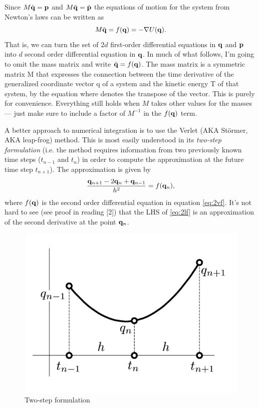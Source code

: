 Since $M\dot{\bf q} = {\bf p}$ and $M\ddot{\bf q} = \dot{\bf p}$ the equations of motion for the system from Newton's laws can be written as
\begin{equation}
	M\ddot{\bf q} = f({\bf q}) = -\nabla U({\bf q}).
	\label{eq:2vf}
\end{equation}
That is, we can turn the set of $2d$ first-order differential equations in ${\bf q}$ and ${\bf p}$ into $d$ second order differential equation in ${\bf q}$.
In much of what follows, I'm going to omit the mass matrix and write $\ddot{\bf q} = f({\bf q})$. The mass matrix is a symmetric matrix M that expresses the connection between the time derivative of the generalized coordinate vector q of a system and the kinetic energy T of that system, by the equation where denotes the transpose of the vector. This is purely for convenience. Everything still holds when $M$ takes other values for the masses --- just make sure to include a factor of $M^{-1}$ in the $f({\bf q})$ term.

A better approach to numerical integration is to use the Verlet (AKA St\"{o}rmer, AKA leap-frog) method. This is most easily understood in its \emph{two-step formulation} (i.e. the method requires information from two previously known time steps ($t_{n-1}$ and $t_n$) in order to compute the approximation at the future time step $t_{n+1}$). The approximation is given by 
\begin{equation}
	\frac{{\bf q}_{n+1} - 2{\bf q}_n + {\bf q}_{n-1}}{h^2} = f({\bf q}_n),
	\label{eq:2lf}
\end{equation}
where $f({\bf q})$ is the second order differential equation in equation \ref{eq:2vf}. It's not hard to see (see proof in reading [2]) that the LHS of \ref{eq:2lf} is an approximation of the second derivative at the point ${\bf q}_n$.

\begin{figure}[H]
	\centering
	\includegraphics[scale=0.7]{twostep}
	\caption{Two-step formulation}
\end{figure}


